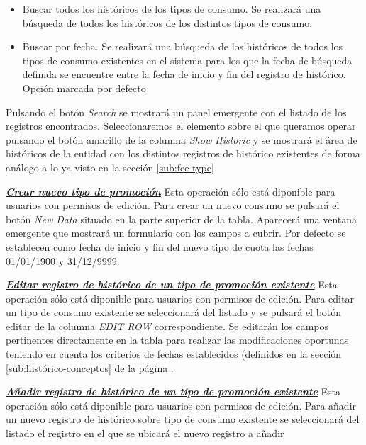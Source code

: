 \begin{itemize}
\item Buscar todos los históricos de los tipos de consumo. Se realizará una búsqueda de todos los históricos de los distintos tipos de consumo.
\item Buscar por fecha. Se realizará una búsqueda de los históricos de todos los tipos de consumo existentes en el sistema para los que la fecha de búsqueda definida se encuentre entre la fecha de inicio y fin del registro de histórico. Opción marcada por defecto
\end{itemize}

Pulsando el botón \emph{Search} se mostrará un panel emergente con el listado de los registros encontrados. Seleccionaremos el elemento sobre el que queramos operar pulsando el botón amarillo de la columna \emph{Show Historic} y se mostrará el área de históricos de la entidad con los distintos registros de histórico existentes de forma análogo a lo ya visto en la sección \ref{sub:fee-type}


\underline{\textsl{\textbf{Crear nuevo tipo de promoción}}}\newline
Esta operación sólo está diponible para usuarios con permisos de edición.
Para crear un nuevo consumo se pulsará el botón \textit{New Data} situado en la parte superior de la tabla. Aparecerá una ventana emergente que mostrará un formulario con los campos a cubrir. Por defecto se establecen como fecha de inicio y fin del nuevo tipo de cuota las fechas 01/01/1900 y 31/12/9999.

\underline{\textsl{\textbf{Editar registro de histórico de un tipo de promoción existente}}}\newline
Esta operación sólo está diponible para usuarios con permisos de edición.
Para editar un tipo de consumo existente se seleccionará del listado y se pulsará el botón editar de la columna \textit{EDIT ROW} correspondiente. Se editarán los campos pertinentes directamente en la tabla para realizar las modificaciones oportunas teniendo en cuenta los criterios de fechas establecidos (definidos en la sección \ref{sub:histórico-conceptos} de la página \pageref{sub:histórico-conceptos}.

\underline{\textsl{\textbf{Añadir registro de histórico de un tipo de promoción existente}}}\newline
Esta operación sólo está diponible para usuarios con permisos de edición.
Para añadir un nuevo registro de histórico sobre tipo de consumo existente se seleccionará del listado el registro en el que se ubicará el nuevo registro a añadir 


